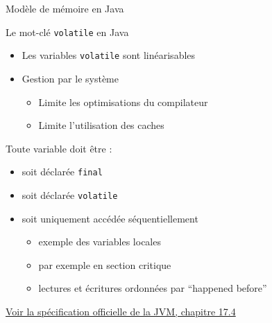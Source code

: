 \begin{frame}[fragile]{Modèle de mémoire en Java}
  \begin{block}{Le mot-clé \lstinline{volatile} en Java}
    \begin{itemize}
    \item Les variables \lstinline{volatile} sont linéarisables
    \item Gestion par le système
      \begin{itemize}
      \item Limite les optimisations du compilateur
      \item Limite l'utilisation des caches
      \end{itemize}
    \end{itemize}
  \end{block}
\vfill
  \begin{alertblock}{Toute variable doit être :}
    \begin{itemize}
    \item soit déclarée \lstinline{final}
    \item soit déclarée \lstinline{volatile}
    \item soit uniquement accédée séquentiellement
      \begin{itemize}
      \item exemple des variables locales
      \item par exemple en section critique
      \item lectures et écritures ordonnées par ``happened before''
      \end{itemize}
    \end{itemize}
  \end{alertblock}
\vfill
\begin{citing}
\item \href{https://docs.oracle.com/javase/specs/jls/se7/html/jls-17.html#jls-17.4}{Voir la spécification officielle de la JVM, chapitre 17.4}
\end{citing}
\end{frame}



